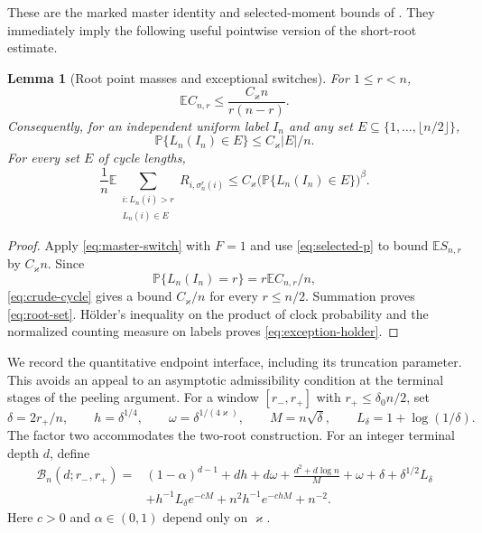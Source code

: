 \documentclass[11pt]{article}
\numberwithin{equation}{section}
\newcommand{\E}{\mathbb E}
\newcommand{\Pp}{\mathbb P}
\newtheorem{lemma}[theorem]{Lemma}
\theoremstyle{definition}
\theoremstyle{remark}
\begin{document}
These are the marked master identity and selected-moment bounds of
\cite{LongMesoscopic2026}.  They immediately imply the following useful
pointwise version of the short-root estimate.

\begin{lemma}[Root point masses and exceptional switches]
\label{lem:root-mass}
For $1\le r<n$,
\begin{equation}\label{eq:crude-cycle}
 \E C_{n,r}\le \frac{C_\varkappa n}{r(n-r)}.
\end{equation}
Consequently, for an independent uniform label $I_n$ and any set
$E\subseteq\{1,\ldots,\lfloor n/2\rfloor\}$,
\begin{equation}\label{eq:root-set}
 \Pp\{L_n(I_n)\in E\}\le C_\varkappa |E|/n.
\end{equation}
For every set $E$ of cycle lengths,
\begin{equation}\label{eq:exception-holder}
 \frac1n\E\sum_{\substack{i:L_n(i)>r\\L_n(i)\in E}}
 R_{i,\sigma_n^r(i)}
 \le C_\varkappa\bigl(\Pp\{L_n(I_n)\in E\}\bigr)^\beta.
\end{equation}
\end{lemma}
\begin{proof}
Apply \eqref{eq:master-switch} with $F=1$ and use
\eqref{eq:selected-p} to bound $\E S_{n,r}$ by $C_\varkappa n$.
Since
\[
 \Pp\{L_n(I_n)=r\}=r\E C_{n,r}/n,
\]
\eqref{eq:crude-cycle} gives a bound $C_\varkappa/n$ for every $r\le n/2$.
Summation proves \eqref{eq:root-set}.  H\"older's inequality on the product
of clock probability and the normalized counting measure on labels proves
\eqref{eq:exception-holder}.
\end{proof}

We record the quantitative endpoint interface, including its truncation
parameter.  This avoids an appeal to an asymptotic admissibility condition
at the terminal stages of the peeling argument.
For a window $[r_-,r_+]$ with $r_+\le\delta_0 n/2$, set
\[
 \delta=2r_+/n,\qquad h=\delta^{1/4},\qquad
 \omega=\delta^{1/(4\varkappa)},\qquad M=n\sqrt\delta,\qquad
 L_\delta=1+\log(1/\delta).
\]
The factor two accommodates the two-root construction.  For an integer
terminal depth $d$, define
\begin{equation}\label{eq:endpoint-bracket}
\begin{split}
 \mathcal B_n(d;r_-,r_+)={}&
 (1-\alpha)^{d-1}+dh+d\omega+\frac{d^2+d\log n}{M}
 +\omega+\delta+\delta^{1/2}L_\delta\\
 &+h^{-1}L_\delta e^{-cM}
   +n^2h^{-1}e^{-chM}+n^{-2}.
\end{split}
\end{equation}
Here $c>0$ and $\alpha\in(0,1)$ depend only on $\varkappa$.
\end{document}
